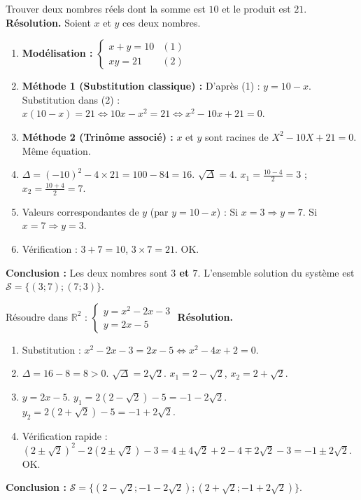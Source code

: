 \documentclass[11pt]{article}
\begin{document}
\begin{exoresolu}
    Trouver deux nombres réels dont la somme est $10$ et le produit est $21$.
    \tcblower
    \textbf{Résolution.}
    Soient $x$ et $y$ ces deux nombres.
    \begin{enumerate}
        \item \textbf{Modélisation :}
        $\begin{cases} x+y=10 & (1) \\ xy=21 & (2) \end{cases}$
        \item \textbf{Méthode 1 (Substitution classique) :} D'après (1) : $y = 10-x$.
        Substitution dans (2) : $x(10-x)=21 \iff 10x-x^2=21 \iff x^2-10x+21=0$.
        \item \textbf{Méthode 2 (Trinôme associé) :} $x$ et $y$ sont racines de $X^2 - 10X + 21 = 0$. Même équation.
        \item $\Delta = (-10)^2 - 4\times 21 = 100-84=16$. $\sqrt{\Delta}=4$.
        $x_1 = \frac{10-4}{2}=3$ ; $x_2 = \frac{10+4}{2}=7$.
        \item Valeurs correspondantes de $y$ (par $y=10-x$) :
        Si $x=3 \Rightarrow y=7$.
        Si $x=7 \Rightarrow y=3$.
        \item Vérification : $3+7=10$, $3\times 7=21$. OK.
    \end{enumerate}
    \textbf{Conclusion :} Les deux nombres sont \textbf{$3$ et $7$}. L'ensemble solution du système est $\mathcal{S}=\{(3;7);(7;3)\}$.
\end{exoresolu}

\begin{exoresolu}
    Résoudre dans $\mathbb{R}^2$ : $\begin{cases} y = x^2 - 2x - 3 \\ y = 2x - 5 \end{cases}$
    \tcblower
    \textbf{Résolution.}
    \begin{enumerate}
        \item Substitution : $x^2 - 2x - 3 = 2x - 5 \iff x^2 - 4x + 2 = 0$.
        \item $\Delta = 16 - 8 = 8 > 0$. $\sqrt{\Delta} = 2\sqrt{2}$.
        $x_1 = 2 - \sqrt{2}$, $x_2 = 2 + \sqrt{2}$.
        \item $y = 2x - 5$.
        $y_1 = 2(2-\sqrt{2})-5 = -1 - 2\sqrt{2}$.
        $y_2 = 2(2+\sqrt{2})-5 = -1 + 2\sqrt{2}$.
        \item Vérification rapide : $(2\pm\sqrt{2})^2 - 2(2\pm\sqrt{2}) - 3 = 4\pm4\sqrt{2}+2 -4\mp2\sqrt{2}-3 = -1\pm2\sqrt{2}$. OK.
    \end{enumerate}
    \textbf{Conclusion :} $\mathcal{S} = \{(2-\sqrt{2}; -1-2\sqrt{2}); (2+\sqrt{2}; -1+2\sqrt{2})\}$.
\end{exoresolu}
\end{document}
